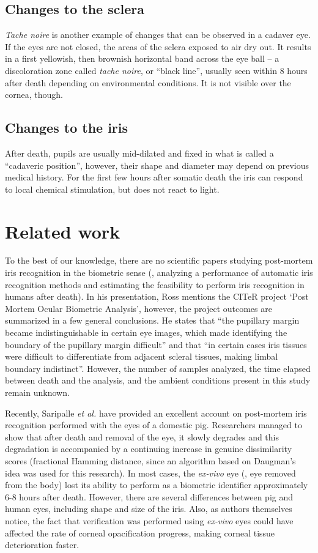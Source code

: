 \documentclass[10pt,twocolumn,letterpaper]{article}
\begin{document}
\subsection{Changes to the sclera}
\emph{Tache noire} is another example of changes that can be observed in a cadaver eye. If the eyes are not closed, the areas of the sclera exposed to air dry out. It results in a first yellowish, then brownish horizontal band across the eye ball -- a discoloration zone called \emph{tache noire}, or ``black line'', usually seen within 8 hours after death depending on environmental conditions. It is not visible over the cornea, though. 
 
 \subsection{Changes to the iris}
After death, pupils are usually mid-dilated and fixed in what is called a ``cadaveric position'', however, their shape and diameter may depend on previous medical history. For the first few hours after somatic death the iris can respond to local chemical stimulation, but does not react to light. 


\section{Related work}
\label{sec:Related}

To the best of our knowledge, there are no scientific papers studying post-mortem iris recognition in the biometric sense (\ie, analyzing a performance of automatic iris recognition methods and estimating the feasibility to perform iris recognition in humans after death). In his presentation, Ross \cite{RossPostMortem} mentions the CITeR project `Post Mortem Ocular Biometric Analysis', however, the project outcomes are summarized in a few general conclusions. He states that ``the pupillary margin became indistinguishable in certain eye images, which made identifying the boundary of the pupillary margin difficult'' and that ``in certain cases iris tissues were difficult to differentiate from adjacent scleral tissues, making limbal boundary indistinct''. However, the number of samples analyzed, the time elapsed between death and the analysis, and the ambient conditions present in this study remain unknown.

Recently, Saripalle \emph{et al.} \cite{PostMortemPigs} have provided an excellent account on post-mortem iris recognition performed with the eyes of a domestic pig. Researchers managed to show that after death and removal of the eye, it slowly degrades and this degradation is accompanied by a continuing increase in genuine dissimilarity scores (fractional Hamming distance, since an algorithm based on Daugman's idea was used for this research). In most cases, the {\it ex-vivo} eye (\ie, eye removed from the body) lost its ability to perform as a biometric identifier approximately 6-8 hours after death. However, there are several differences between pig and human eyes, including shape and size of the iris. Also, as authors themselves notice, the fact that verification was performed using {\it ex-vivo} eyes could have affected the rate of corneal opacification progress, making corneal tissue deterioration faster. 
\end{document}
